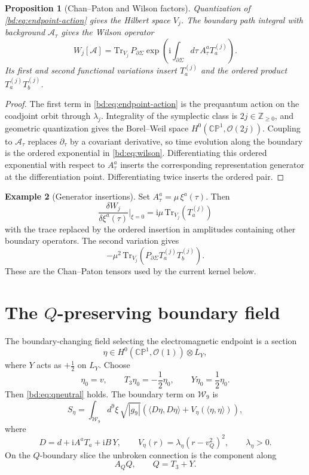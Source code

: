 \documentclass[11pt]{article}
\newcommand{\CP}{\mathbb{CP}}
\newcommand{\ZZ}{\mathbb{Z}}
\newcommand{\WW}{\mathcal{W}}
\newcommand{\OO}{\mathcal{O}}
\newcommand{\ii}{\mathrm{i}}
\newcommand{\Tr}{\mathrm{Tr}}
\theoremstyle{plain}
\newtheorem{proposition}{Proposition}[section]
\theoremstyle{definition}
\newtheorem{example}[proposition]{Example}
\begin{document}
\begin{proposition}[Chan--Paton and Wilson factors]
\label{bd:prop:cp-wilson}
Quantization of \eqref{bd:eq:endpoint-action} gives the Hilbert space \(V_j\).
The boundary path integral with background \(\mathcal A_\tau\) gives the Wilson
operator
\begin{equation}
  W_j[\mathcal A]
  =
  \Tr_{V_j}\,
  P_{\partial\Sigma}
  \exp\left(\ii\int_{\partial\Sigma}d\tau\,
  A_\tau^aT_a^{(j)}\right).
  \label{bd:eq:wilson}
\end{equation}
Its first and second functional variations insert \(T_a^{(j)}\) and
the ordered product \(T_a^{(j)}T_b^{(j)}\).
\end{proposition}

\begin{proof}
The first term in \eqref{bd:eq:endpoint-action} is the prequantum action on the
coadjoint orbit through \(\lambda_j\).  Integrality of the symplectic class is
\(2j\in\ZZ_{\ge0}\), and geometric quantization gives the Borel--Weil space
\(H^0(\CP^1,\OO(2j))\).  Coupling to \(\mathcal A_\tau\) replaces
\(\partial_\tau\) by a covariant derivative, so time evolution along the
boundary is the ordered exponential in \eqref{bd:eq:wilson}.  Differentiating this
ordered exponential with respect to \(A_\tau^a\) inserts the corresponding
representation generator at the differentiation point.  Differentiating twice
inserts the ordered pair.
\end{proof}

\begin{example}[Generator insertions]
\label{bd:ex:insertions}
Set \(A_\tau^a=\mu\,\xi^a(\tau)\).  Then
\[
  \frac{\delta W_j}{\delta \xi^a(\tau)}\bigg|_{\xi=0}
  =
  \ii\mu\,\Tr_{V_j}(T_a^{(j)})
\]
with the trace replaced by the ordered insertion in amplitudes containing other
boundary operators.  The second variation gives
\[
  -\mu^2\,
  \Tr_{V_j}\!\left(P_{\partial\Sigma}T_a^{(j)}T_b^{(j)}\right).
\]
These are the Chan--Paton tensors used by the current kernel below.
\end{example}

\section{The \(Q\)-preserving boundary field}
\label{bd:sec:q-boundary}

The boundary-changing field selecting the electromagnetic endpoint is a section
\[
  \eta\in H^0(\CP^1,\OO(1))\otimes L_Y ,
\]
where \(Y\) acts as \(+\tfrac12\) on \(L_Y\).  Choose
\[
  \eta_0=v,\qquad T_3\eta_0=-\frac12\eta_0,\qquad Y\eta_0=\frac12\eta_0 .
  \label{bd:eq:eta0}
\]
Then \eqref{bd:eq:qneutral} holds.  The boundary term on \(\WW_9\) is
\begin{equation}
  S_\eta
  =
  \int_{\WW_9}d^9\xi\,\sqrt{|g_9|}
  \left(
  \langle D\eta,D\eta\rangle+V_\eta(\langle\eta,\eta\rangle)
  \right),
  \label{bd:eq:seta}
\end{equation}
where
\[
  D=d+\ii A^aT_a+\ii B\,Y,\qquad
  V_\eta(r)=\lambda_\eta(r-v_Q^2)^2,\qquad \lambda_\eta>0 .
\]
On the \(Q\)-boundary slice the unbroken connection is the component along
\[
  A_QQ,\qquad Q=T_3+Y .
\]
\end{document}
